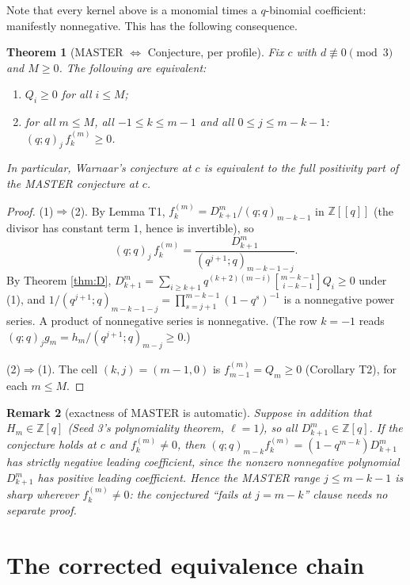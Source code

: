 \documentclass[11pt]{article}
\newtheorem{theorem}{Theorem}
\newtheorem{remark}[theorem]{Remark}
\newcommand{\qbin}[2]{\genfrac{[}{]}{0pt}{}{#1}{#2}}
\newcommand{\ZZ}{\mathbb{Z}}
\begin{document}
Note that every kernel above is a monomial times a $q$-binomial coefficient: manifestly
nonnegative. This has the following consequence.

\begin{theorem}[MASTER $\Leftrightarrow$ Conjecture, per profile]\label{thm:M}
Fix $c$ with $d\not\equiv0\pmod3$ and $M\ge0$. The following are equivalent:
\begin{enumerate}
\item $Q_i\ge 0$ for all $i\le M$;
\item for all $m\le M$, all $-1\le k\le m-1$ and all $0\le j\le m-k-1$:
$(q;q)_j\,f_k^{(m)}\ge 0$.
\end{enumerate}
In particular, Warnaar's conjecture at $c$ is equivalent to the full positivity part of
the MASTER conjecture at $c$.
\end{theorem}

\begin{proof}
(1)$\Rightarrow$(2). By Lemma T1, $f_k^{(m)}=D_{k+1}^m/(q;q)_{m-k-1}$ in $\ZZ[[q]]$
(the divisor has constant term $1$, hence is invertible), so
\[
(q;q)_j\,f_k^{(m)}
=\frac{D_{k+1}^m}{(q^{j+1};q)_{m-k-1-j}} .
\]
By Theorem \ref{thm:D}, $D_{k+1}^m=\sum_{i\ge k+1}q^{(k+2)(m-i)}\qbin{m-k-1}{i-k-1}Q_i\ge0$
under (1), and $1/(q^{j+1};q)_{m-k-1-j}=\prod_{s=j+1}^{m-k-1}(1-q^s)^{-1}$ is a nonnegative
power series. A product of nonnegative series is nonnegative. (The row $k=-1$ reads
$(q;q)_jg_m=h_m/(q^{j+1};q)_{m-j}\ge0$.)

(2)$\Rightarrow$(1). The cell $(k,j)=(m-1,0)$ is $f_{m-1}^{(m)}=Q_m\ge 0$
(Corollary T2), for each $m\le M$.
\end{proof}

\begin{remark}[exactness of MASTER is automatic]\label{rem:exact}
Suppose in addition that $H_m\in\ZZ[q]$ (Seed 3's polynomiality theorem, $\ell=1$), so all
$D_{k+1}^m\in\ZZ[q]$. If the conjecture holds at $c$ and $f_k^{(m)}\neq0$, then
$(q;q)_{m-k}f_k^{(m)}=(1-q^{m-k})D_{k+1}^m$ has strictly negative leading coefficient,
since the nonzero nonnegative polynomial $D_{k+1}^m$ has positive leading coefficient.
Hence the MASTER range $j\le m-k-1$ is sharp wherever $f_k^{(m)}\neq0$: the conjectured
``fails at $j=m-k$'' clause needs no separate proof.
\end{remark}

\section{The corrected equivalence chain}
\end{document}
